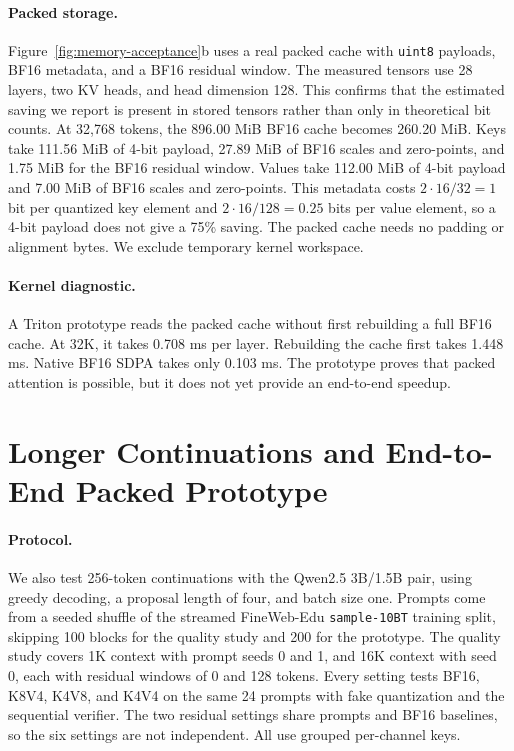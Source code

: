 \documentclass{article}
\begin{document}
\paragraph{Packed storage.}
Figure~\ref{fig:memory-acceptance}b uses a real packed cache with
\texttt{uint8} payloads, BF16 metadata, and a BF16 residual window. The measured
tensors use 28 layers, two KV heads, and head dimension 128. This confirms that
the estimated saving we report is present in stored tensors rather than only in
theoretical bit counts. At 32,768 tokens, the 896.00 MiB BF16 cache becomes
260.20 MiB. Keys take 111.56 MiB of 4-bit payload, 27.89 MiB of BF16 scales and
zero-points, and 1.75 MiB for the BF16 residual window. Values take 112.00 MiB
of 4-bit payload and 7.00 MiB of BF16 scales and zero-points. This metadata costs
$2\cdot 16/32=1$ bit per quantized key element and $2\cdot 16/128=0.25$ bits
per value element, so a 4-bit payload does not give a 75\% saving. The packed cache
needs no padding or alignment bytes. We exclude temporary kernel workspace.

\paragraph{Kernel diagnostic.}
A Triton prototype reads the packed cache without first rebuilding a full BF16
cache. At 32K, it takes 0.708 ms per layer. Rebuilding the cache first takes
1.448 ms. Native BF16 SDPA takes only 0.103 ms. The prototype proves that packed
attention is possible, but it does not yet provide an end-to-end speedup.

\section{Longer Continuations and End-to-End Packed Prototype}
\label{app:followup}

\paragraph{Protocol.}
We also test 256-token continuations with the Qwen2.5 3B/1.5B pair, using
greedy decoding, a proposal length of four, and batch size one. Prompts come
from a seeded shuffle of the streamed FineWeb-Edu \texttt{sample-10BT} training
split, skipping 100 blocks for the quality study and 200 for the prototype. The quality study covers 1K context with
prompt seeds 0 and 1, and 16K context with seed 0, each with residual windows
of 0 and 128 tokens. Every setting tests BF16, K8V4, K4V8, and K4V4 on the same
24 prompts with fake quantization and the sequential verifier. The two residual
settings share prompts and BF16 baselines, so the six settings are not
independent. All use grouped per-channel keys.
\end{document}
